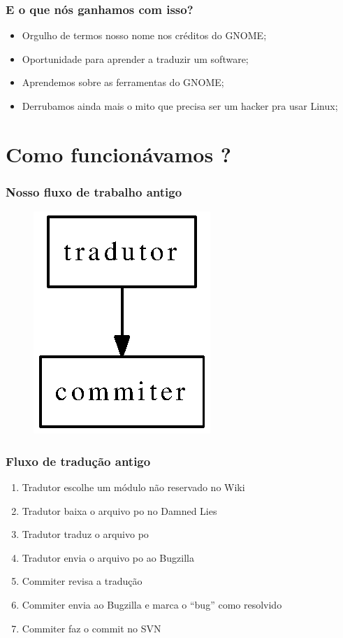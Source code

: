 \documentclass{beamer}
\begin{document}
\begin{frame}
  \frametitle{E o que nós ganhamos com isso?}
  \begin{itemize}
    \item Orgulho de termos nosso nome nos créditos do GNOME;
    \item Oportunidade para aprender a traduzir um software;
    \item Aprendemos sobre as ferramentas do GNOME;
    \item Derrubamos ainda mais o mito que precisa ser um hacker pra usar Linux;
  \end{itemize}
\end{frame}


\section{Como funcionávamos ?}

\begin{frame}
    \frametitle{Nosso fluxo de trabalho antigo}
    \begin{figure}[ht]
        \includegraphics{figures/fluxo_antigo.eps}     
    \end{figure}
\end{frame}

\begin{frame}
    \frametitle{Fluxo de tradução antigo}
    \begin{enumerate}[<+->]
        \item Tradutor escolhe um módulo não reservado no Wiki
        \item Tradutor baixa o arquivo po no Damned Lies
        \item Tradutor traduz o arquivo po
        \item Tradutor envia o arquivo po ao Bugzilla
        \item Commiter revisa a tradução 
        \item Commiter envia ao Bugzilla e marca o ``bug'' como resolvido
        \item Commiter faz o commit no SVN
    \end{enumerate}
\end{frame}
\end{document}
